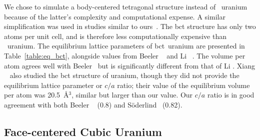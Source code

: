 We chose to simulate a body-centered tetragonal structure instead of
\textbeta~uranium because of the latter's complexity and computational expense.
A similar simplification was used in studies similar to
ours~\cite{beeler2013first,li2012structure}.
The bct structure has only two atoms per unit cell, and is therefore less
computationally expensive than \textbeta~uranium.
The equilibrium lattice parameters of bct~uranium are presented in
Table~\ref{table:eq_bct}, alongside values from Beeler
\etal~\cite{beeler2013first} and Li \etal~\cite{li2012structure}.
The volume per atom agrees well with Beeler \etal\ but is significantly
different from that of Li \etal.
Xiang \etal~\cite{xiang2008quantum} also studied the bct structure of uranium,
though they did not provide the equilibrium lattice parameter or $c/a$ ratio;
their value of the equilibrium volume per atom was 20.5~\AA$^3$, similar but
larger than our value. Our $c/a$ ratio is in good agreement with
both Beeler \etal~\cite{beeler2013first} (0.8) and
S\"oderlind~\cite{Soderlind1998} (0.82).

\subsection{Face-centered Cubic Uranium}
\label{subsec_fcc}

